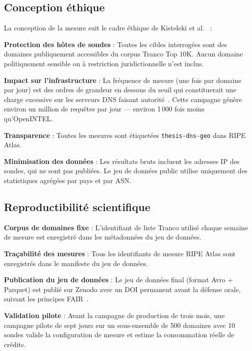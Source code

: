 \subsection{Conception éthique}
\label{subsec:3.6.1}

La conception de la mesure suit le cadre éthique de Kisteleki et al.~\cite{Kisteleki2016} :

\textbf{Protection des hôtes de sondes} : Toutes les cibles interrogées sont des domaines publiquement accessibles du corpus Tranco Top 10K. Aucun domaine politiquement sensible ou à restriction juridictionnelle n'est inclus.

\textbf{Impact sur l'infrastructure} : La fréquence de mesure (une fois par domaine par jour) est des ordres de grandeur en dessous du seuil qui constituerait une charge excessive sur les serveurs DNS faisant autorité~\cite{vanRijswijk2016}. Cette campagne génère environ un million de requêtes par jour --- environ 1\,000 fois moins qu'OpenINTEL.

\textbf{Transparence} : Toutes les mesures sont étiquetées \texttt{thesis-dns-geo} dans RIPE Atlas.

\textbf{Minimisation des données} : Les résultats bruts incluent les adresses IP des sondes, qui ne sont pas publiées. Le jeu de données public utilise uniquement des statistiques agrégées par pays et par ASN.

\subsection{Reproductibilité scientifique}
\label{subsec:3.6.2}

\textbf{Corpus de domaines fixe} : L'identifiant de liste Tranco utilisé chaque semaine de mesure est enregistré dans les métadonnées du jeu de données.

\textbf{Traçabilité des mesures} : Tous les identifiants de mesure RIPE Atlas sont enregistrés dans le manifeste du jeu de données.

\textbf{Publication du jeu de données} : Le jeu de données final (format Avro + Parquet) est publié sur Zenodo avec un DOI permanent avant la défense orale, suivant les principes FAIR~\cite{vanRijswijk2016}.

\textbf{Validation pilote} : Avant la campagne de production de trois mois, une campagne pilote de sept jours sur un sous-ensemble de 500 domaines avec 10 sondes valide la configuration de mesure et estime la consommation réelle de crédits.
\bigskip
